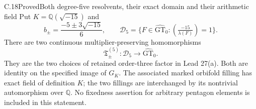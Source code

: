 \begin{statement}{C.18}{Proved}{Both degree-five resolvents, their exact domain and their arithmetic field}
Put $K=\mathbb Q(\sqrt{-15})$ and
\[
 b_\pm=\frac{-5\pm3\sqrt{-15}}6,\qquad
 \mathcal D_5=\{F\in\widehat{\mathrm{GT}}_0:
                         (\tfrac{-15}{\lambda(F)})=1\}.
\]
There are two continuous multiplier-preserving homomorphisms
\[
              \mathfrak T^{(5)}_\pm:\mathcal D_5
                      \longrightarrow\widehat{\mathrm{GT}}_0.
\]
They are the two choices of retained order-three factor in
Lead 27(a). Both are identity on the specified image of $G_K$.
The associated marked orbifold filling has exact field of
definition $K$; the two fillings are interchanged by its
nontrivial automorphism over $\mathbb Q$.
No fixedness assertion for arbitrary pentagon elements is
included in this statement.
\end{statement}
